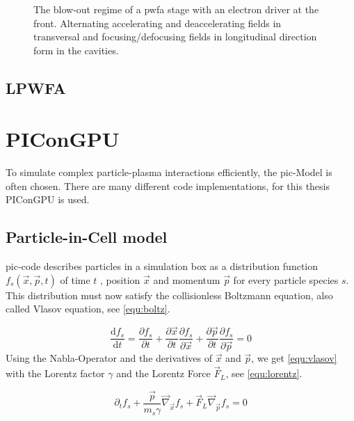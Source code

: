 \documentclass[bachelor_thesis]{subfiles}
\begin{document}
\begin{figure}
	\centering
	\missingfigure{}
	\caption{The blow-out regime of a \gls{pwfa} stage with an electron driver at the front. Alternating accelerating and deaccelerating fields in transversal and focusing/defocusing fields in longitudinal direction form in the cavities.}
	\label{fig:pwfa}
\end{figure} 

\subsection{LPWFA} \label{chap:lpfwa}

\section{PIConGPU}
To simulate complex particle-plasma interactions efficiently, the \gls{pic}-Model is often chosen. There are many different code implementations, for this thesis PIConGPU \cite{PIConGPU2013, PICRepo} is used.

\subsection{Particle-in-Cell model} \label{chap:pic}
\Gls{pic}-code describes particles in a simulation box as a distribution function $f_s(\vec{x}, \vec{p}, t)$ of time $t$ , position $\vec{x}$ and momentum $\vec{p}$ for every particle species $s$.
This distribution must now satisfy the collisionless Boltzmann equation, also called Vlasov equation\cite{Vlasov1968}, see \autoref{equ:boltz}.

\begin{equation}
	\frac{\mathrm{d}f_s}{\mathrm{d}t}=\frac{\partial f_s}{\partial t} + \frac{\partial \vec{x}}{\partial t} \frac{\partial f_s}{\partial \vec{x}} + \frac{\partial \vec{p}}{\partial t} \frac{\partial f_s}{\partial \vec{p}} = 0
	\label{equ:boltz}
\end{equation}
Using the Nabla-Operator and the derivatives of $\vec{x}$ and $\vec{p}$, we get \autoref{equ:vlasov} with the Lorentz factor $\gamma$ and the Lorentz Force $\vec{F}_L$, see \autoref{equ:lorentz}.

\begin{equation}
	\partial_t f_s + \frac{\vec{p}}{m_s \gamma} \vec{\nabla}_{\vec{x}} f_s + \vec{F}_L \vec{\nabla}_{\vec{p}} f_s = 0
	\label{equ:vlasov}
\end{equation}
\end{document}
